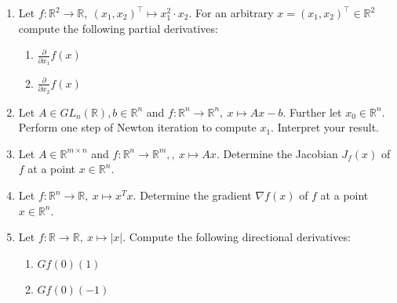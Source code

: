 \begin{enumerate}
	\item Let $f\colon \mathbb{R}^2 \to \mathbb{R},~(x_1,x_2)^\top \mapsto x_1^2 \cdot x_2$. For an arbitrary $x=(x_1,x_2)^\top \in \mathbb{R}^2$ compute the following partial derivatives:
	\begin{enumerate}
		\item $\frac{\partial}{\partial x_1} f(x)$
		\item $\frac{\partial}{\partial x_2} f(x)$
	\end{enumerate}
	\item Let $A\in GL_n(\mathbb{R}), b \in \mathbb{R}^n$ and $f : \mathbb{R}^{n} \to \mathbb{R}^n, ~x \mapsto Ax -b $. Further let $x_0 \in \mathbb{R}^n$. Perform one step of Newton iteration to compute $x_1$. Interpret your result.
	\item Let $A\in \mathbb{R}^{m \times n}$ and $f : \mathbb{R}^{n} \to \mathbb{R}^m,, ~x \mapsto Ax $. Determine the Jacobian $J_f(x)$ of $f$ at a point $x \in\mathbb{R}^{n}$.
	\item Let $f : \mathbb{R}^{n} \to \mathbb{R},~ x \mapsto x^T  x $. Determine the gradient $\nabla f(x)$ of $f$ at a point $x \in\mathbb{R}^{n}$.
	\item Let $f\colon \mathbb{R} \to \mathbb{R},~x\mapsto |x|$. Compute the following directional derivatives:
	\begin{enumerate}
		\item $Gf(0)(1)$
		\item $Gf(0)(-1)$
	\end{enumerate}
	
\end{enumerate}